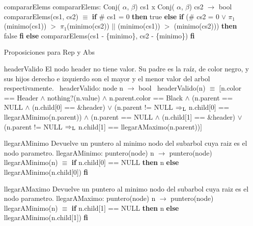 \begin{DoxyParagraph}{comparar\+Elems}
comparar\+Elems\+: Conj( $\alpha$, $\beta$) cs1 x Conj( $\alpha$, $\beta$) cs2 $\to$ bool~\newline
comparar\+Elems(cs1, cs2) $\equiv$ {\bfseries if} \# cs1 = 0 {\bfseries then} true {\bfseries else} {\bfseries if} (\# cs2 = 0 $\lor$ $\pi_1$(minimo(cs1)) $>$ $\pi_1$(minimo(cs2)) $\vert$$\vert$ (minimo(cs1)) $>$ (minimo(cs2))) {\bfseries then} false {\bfseries fi} {\bfseries else} comparar\+Elems(cs1 -\/ \{minimo\}, cs2 -\/ \{minimo\}) {\bfseries fi} 
\end{DoxyParagraph}


Proposiciones para Rep y Abs

\begin{DoxyParagraph}{header\+Valido}
El nodo header no tiene valor. Su padre es la raíz, de color negro, y sus hijos derecho e izquierdo son el mayor y el menor valor del arbol respectivamente.~\newline
header\+Valido\+: node n $\to$ bool~\newline
header\+Valido(n) $\equiv$ \mbox{[}n.\+color == Header $\land$ nothing?(n.\+value) $\land$ n.\+parent.\+color == Black $\land$ (n.\+parent == N\+U\+LL $\land$ (n.\+child\mbox{[}0\mbox{]} == \&header) $\lor$ (n.\+parent != N\+U\+LL $\Rightarrow_{\rm L}$ n.\+child\mbox{[}0\mbox{]} == llegar\+A\+Minimo(n.\+parent)) $\land$ (n.\+parent == N\+U\+LL $\land$ (n.\+child\mbox{[}1\mbox{]} == \&header) $\lor$ (n.\+parent != N\+U\+LL $\Rightarrow_{\rm L}$ n.\+child\mbox{[}1\mbox{]} == llegar\+A\+Maximo(n.\+parent))\mbox{]} 
\end{DoxyParagraph}


\begin{DoxyParagraph}{llegar\+A\+Minimo}
Devuelve un puntero al minimo nodo del subarbol cuya raiz es el nodo parametro. llegar\+A\+Minimo\+: puntero(node) n $\to$ puntero(node)~\newline
llegar\+A\+Minimo(n) $\equiv$ {\bfseries if} n.\+child\mbox{[}0\mbox{]} == N\+U\+LL {\bfseries then} n {\bfseries else} llegar\+A\+Minimo(n.\+child\mbox{[}0\mbox{]}) {\bfseries fi} 
\end{DoxyParagraph}


\begin{DoxyParagraph}{llegar\+A\+Maximo}
Devuelve un puntero al minimo nodo del subarbol cuya raiz es el nodo parametro. llegar\+A\+Maximo\+: puntero(node) n $\to$ puntero(node)~\newline
llegar\+A\+Minimo(n) $\equiv$ {\bfseries if} n.\+child\mbox{[}1\mbox{]} == N\+U\+LL {\bfseries then} n {\bfseries else} llegar\+A\+Minimo(n.\+child\mbox{[}1\mbox{]}) {\bfseries fi} 
\end{DoxyParagraph}


